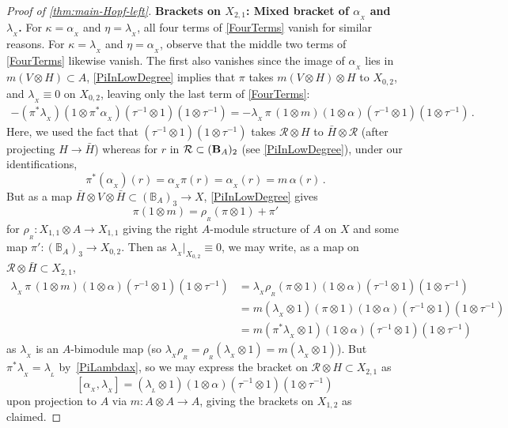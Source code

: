 \documentclass[11pt]{amsart}
\numberwithin{equation}{section}
\newcommand{\X}{_X}
\newcommand{\alphax}{\alpha_{\X}}
\newcommand{\lambdax}{\lambda_{\X}}
\newcommand{\gammax}{\kappa} %
\newcommand{\etax}{\eta}
\newcommand{\R}{\mathcal{R}}
\newcommand{\B}{{\bf B}} %
\newcommand{\BB}{\mathbb{B}} %
\newcommand{\itau}{{\tau^{-1}}}%
\renewcommand{\_}[1]{\mbox{$_{\left( #1 \right)}$}}
\newcommand{\ot}{\otimes}
\begin{document}
{\begin{proof}[Proof of \cref{thm:main-Hopf-left}]
{\bf Brackets on $X_{2,1}$: Mixed bracket of $\alphax$ and $\lambdax$.}
  For $\gammax=\alphax$ and $\etax = \lambdax$, all four terms of
   \cref{FourTerms} vanish for similar reasons.
  For $\gammax=\lambdax$ and $\etax=\alphax$,
observe that the middle two terms of \cref{FourTerms} likewise vanish.  The
   first also vanishes since 
   the image of $\alphax$ lies in $m(V\ot H)\subset A$,
   \cref{PiInLowDegree}  implies that $\pi$ takes $m(V\ot H)\ot H$ to
   $X_{0,2}$,
      and $\lambdax\equiv  0$
   on $X_{0,2}$, leaving only the last term
   of \cref{FourTerms}:
   $$
   \begin{aligned}
     -(\pi^*\lambdax)(1\ot \pi^*\alphax)(\itau\ot 1)(1\ot \itau) 
     =
     -\lambdax\, \pi\, (1\ot m)(1\ot \alpha)(\itau\ot 1)(1\ot \itau) 
\, .
      \end{aligned}
      $$
      Here, we used the fact that
      $(\itau\ot 1)(1\ot \itau)$ takes $\R\ot H$ to $\bar H\ot \R$
      (after projecting $H \rightarrow \bar H$)
   whereas for $r$ in $\R\subset (\B_A)_2$ (see \cref{PiInLowDegree}),
under our identifications,
\begin{equation}\label{PiOnR}
  \pi^*(\alphax) (r) 
=\alphax\pi (r) 
=\alphax(r) 
=m\, \alpha(r) 
\, .
\end{equation}
   But as a map $\bar H\ot V\ot \bar H\subset (\BB_A)_3\rightarrow X$,
   \cref{PiInLowDegree} gives
   $$
   \pi (1\ot m)= \rho_{_R}(\pi\ot 1) + \pi'
     $$
for $\rho_{_R}: X_{1,1}\ot A\rightarrow X_{1,1}$ giving the right $A$-module 
structure of $A$ on $X$ and some map $\pi':(\BB_A)_3\rightarrow X_{0,2}$.
Then as
$\lambdax|_{X_{0,2}}\equiv 0$, we may write,
as a map on $\R\ot \bar H\subset X_{2,1}$,
     $$
   \begin{aligned}
         \lambdax \,\pi\, (1\ot m)(1\ot \alpha)(\itau\ot 1)(1\ot
     \itau)
         & =
     \lambdax \rho_{_R} (\pi\ot 1) (1\ot \alpha)(\itau\ot
     1)(1\ot \itau)
     \\  & =
     m (\lambdax\ot 1) (\pi \ot 1) (1\ot \alpha)(\itau\ot 1)(1\ot
     \itau)
     \\  & =
     m (\pi^* \lambdax \ot 1) (1\ot \alpha)(\itau\ot 1)(1\ot
     \itau)
     \end{aligned}
       $$       
       as $\lambdax$ is an $A$-bimodule map
       (so $\lambdax \rho_{_R} =\rho_{_R}(\lambdax\ot 1)=m(\lambdax\ot
       1)$).
       But $\pi^*\lambdax=\lambda_{_L}$ by~\cref{PiLambdax},
  so
    we may express
     the bracket
on $\R\ot H\subset X_{2,1}$ as
$$
   [\alphax, \lambdax]=
   (\lambda_{_L} \ot 1) (1\ot \alpha)(\itau\ot 1)(1\ot \itau )
\, 
   $$
   upon projection to $A$ via
$m:A\ot A\rightarrow A$, giving 
the brackets on $X_{1,2}$ as claimed.


\end{proof}}
\end{document}
